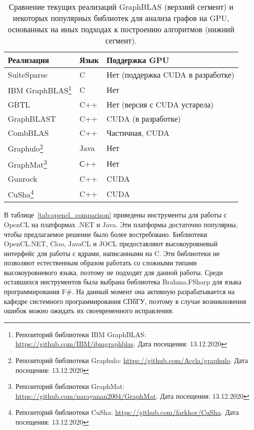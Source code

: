 \begin{table}
    \begin{minipage}{\linewidth}
    \begin{tabular}{l|l|l}
        Реализация & Язык & Поддержка GPU \\
        \hline \hline
        SuiteSparse~\cite{suitesparse} & C & Нет (поддержка CUDA в разработке) \\
        IBM GraphBLAS\footnote{Репозиторий библиотеки IBM GraphBLAS: \url{https://github.com/IBM/ibmgraphblas}. Дата посещения: 13.12.2020} & C & Нет \\
        GBTL~\cite{gbtl} & C++ & Нет (версия с CUDA устарела) \\
        GraphBLAST~\cite{blast} & C++ & CUDA (в разработке) \\
        CombBLAS~\cite{combblas} & C++ & Частичная, CUDA \\
        Graphulo\footnote{Репозиторий библиотеки Graphulo: \url{https://github.com/Accla/graphulo}. Дата посещения: 13.12.2020} & Java & Нет \\ 
        GraphMat\footnote{Репозиторий библиотеки GraphMat: \url{https://github.com/narayanan2004/GraphMat}. Дата посещения: 13.12.2020} & С++ & Нет \\
        \hline
        Gunrock~\cite{gunrock} & C++ & CUDA \\
        CuSha\footnote{Репозиторий библиотеки CuSha: \url{https://github.com/farkhor/CuSha}. Дата посещения: 13.12.2020} & C++ & CUDA \\
        \hline
    \end{tabular}
    \end{minipage}
    \caption{Сравнение текущих реализаций GraphBLAS (верхний сегмент) и некоторых популярных библиотек для анализа графов на GPU, основанных на иных подходах к построению алгоритмов (нижний сегмент).}
    \label{tab:libs_comparison}
\end{table}

В таблице~\ref{tab:opencl_comparison} приведены инструменты для работы с OpenCL на платформах .NET и Java. Эти платформы достаточно популярны, чтобы предлагаемое решение было более востребовано. Библиотеки \\ OpenCL.NET, Cloo, JavaCL и JOCL предоставляют высокоуровневый интерфейс для работы с ядрами, написанными на C. Эти библиотеки не позволяют естественным образом работать со сложными типами высокоуровневого языка, поэтому не подходят для данной работы. Среди оставшихся инструментов была выбрана библиотека Brahma.FSharp для языка программирования F\#. На данный момент она активную разрабатывается на кафедре системного программирования СПбГУ, поэтому в случае возникновения ошибок можно ожидать их своевременного исправления.

